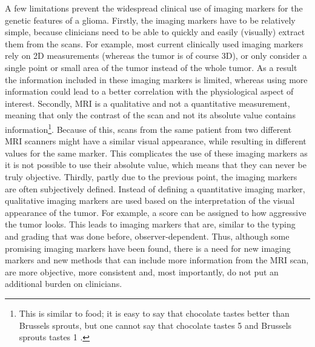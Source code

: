 A few limitations prevent the widespread clinical use of imaging markers for the genetic features of a \gls{glioma}.
Firstly, the imaging markers have to be relatively simple, because clinicians need to be able to quickly and easily (visually) extract them from the scans.
For example, most current clinically used imaging markers rely on 2D measurements (whereas the \gls{tumor} is of course 3D), or only consider a single point or small area of the \gls{tumor} instead of the whole \gls{tumor}.
As a result the information included in these imaging markers is limited, whereas using more information could lead to a better correlation with the physiological aspect of interest.
Secondly, \gls{MRI} is a qualitative and not a quantitative measurement, meaning that only the contrast of the scan and not its absolute value contains information\footnote{This is similar to food; it is easy to say that chocolate tastes better than Brussels sprouts, but one cannot say that chocolate tastes 5  and Brussels sprouts tastes 1 .}.
Because of this, scans from the same patient from two different \gls{MRI} scanners might have a similar visual appearance, while resulting in different values for the same marker.
This complicates the use of these imaging markers as it is not possible to use their absolute value, which means that they can never be truly objective.
Thirdly, partly due to the previous point, the imaging markers are often subjectively defined.
Instead of defining a quantitative imaging marker, qualitative imaging markers are used based on the interpretation of the visual appearance of the \gls{tumor}.
For example, a score can be assigned to how aggressive the \gls{tumor} looks.
This leads to imaging markers that are, similar to the typing and grading that was done before, observer-dependent.
Thus, although some promising imaging markers have been found, there is a need for new imaging markers and new methods that can include more information from the \gls{MRI} scan, are more objective, more consistent and, most importantly, do not put an additional burden on clinicians.

